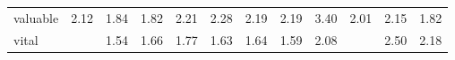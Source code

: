 \begin{tabular}{lrrrrrrrrrrr}
valuable & \cellcolor{blue!42} 2.12 & \cellcolor{blue!36} 1.84 & \cellcolor{blue!36} 1.82 & \cellcolor{blue!44} 2.21 & \cellcolor{blue!45} 2.28 & \cellcolor{blue!43} 2.19 & \cellcolor{blue!43} 2.19 & \cellcolor{blue!68} 3.40 & \cellcolor{blue!40} 2.01 & \cellcolor{blue!43} 2.15 & \cellcolor{blue!36} 1.82 \\
vital &  & \cellcolor{blue!30} 1.54 & \cellcolor{blue!33} 1.66 & \cellcolor{blue!35} 1.77 & \cellcolor{blue!32} 1.63 & \cellcolor{blue!32} 1.64 & \cellcolor{blue!31} 1.59 & \cellcolor{blue!41} 2.08 &  & \cellcolor{blue!50} 2.50 & \cellcolor{blue!43} 2.18 \\
\bottomrule
\end{tabular}
